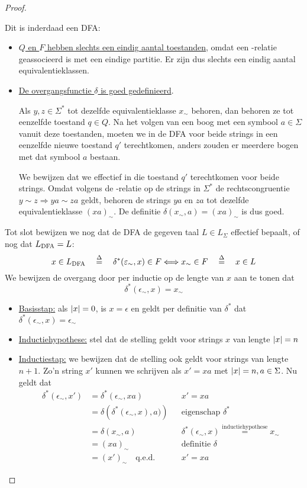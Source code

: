 \documentclass[../aanvullingen_cursus.tex]{subfiles}
\begin{document}
\begin{proof}
\begin{enumerate}
		Dit is inderdaad een DFA:
		\begin{itemize}
			\item  \underline{\(Q\) en \(F\) hebben slechts een eindig aantal toestanden}, omdat een \mnl-relatie geassocieerd is met een eindige partitie. Er zijn dus slechts een eindig aantal equivalentieklassen.
			\item \underline{De overgangsfunctie \(\delta\) is goed gedefinieerd}.

			Als \(y,z\in\Sigma^*\) tot dezelfde equivalentieklasse \(x_\sim\) behoren, dan behoren ze tot eenzelfde toestand \(q\in Q\). Na het volgen van een boog met een symbool \(a \in \Sigma\) vanuit deze toestanden, moeten we in de DFA voor beide strings in een eenzelfde nieuwe toestand \(q'\) terechtkomen, anders zouden er meerdere bogen met dat symbool \(a\) bestaan.

			We bewijzen dat we effectief in die toestand \(q'\) terechtkomen voor beide strings. Omdat volgens de \mnl-relatie op de strings in \(\Sigma^*\) de rechtscongruentie \(y \sim z \Rightarrow ya \sim za\) geldt, behoren de strings \(ya\) en \(za\) tot dezelfde equivalentieklasse \((xa)_\sim\). De definitie \(\delta(x_\sim,a)=(xa)_\sim\) is dus goed.
		\end{itemize}

		Tot slot bewijzen we nog dat de DFA de gegeven taal \(L \in L_\Sigma\) effectief bepaalt, of nog dat \(L_{\text{DFA}} = L\): \[x \in L_{\text{DFA}} \quad \overset{\Delta}{=} \quad \delta^*(\varepsilon_\sim,x)\in F \Longleftrightarrow x_\sim \in F \quad \overset{\Delta}{=} \quad x\in L \] We bewijzen de overgang door per inductie op de lengte van \(x\) aan te tonen dat \[\delta^*(\epsilon_\sim,x)=x_\sim\]
		\begin{itemize}
			\item \underline{Basisstap:} als \(\lvert x \rvert=0\), is \(x=\epsilon\) en geldt per definitie van \(\delta^*\) dat \(\delta^*(\epsilon_\sim,x)=\epsilon_\sim\)
			\item \underline{Inductiehypothese:} stel dat de stelling geldt voor strings \(x\) van lengte \(\lvert x \rvert=n\)
			\item \underline{Inductiestap:} we bewijzen dat de stelling ook geldt voor strings van lengte \(n+1\). Zo'n string \(x'\) kunnen we schrijven als \(x'=xa\) met \(\lvert x \rvert=n,a\in \Sigma\). Nu geldt dat
			\begin{align*}
				\delta^*(\epsilon_\sim,x')&=\delta^*(\epsilon_\sim,xa) && x'=xa\\
				&=\delta\left(\delta^*(\epsilon_\sim,x),a)\right) && \text{eigenschap } \delta^* \\
				&=\delta(x_\sim,a) && \delta^*(\epsilon_\sim,x) \overset{\text{inductiehypothese}}{=}x_\sim \\
				&=(xa)_\sim && \text{definitie } \delta \\
				&=(x')_\sim \quad \text{q.e.d.} && x'=xa
			\end{align*}
		\end{itemize}
	\end{enumerate}


\end{proof}
\end{document}
